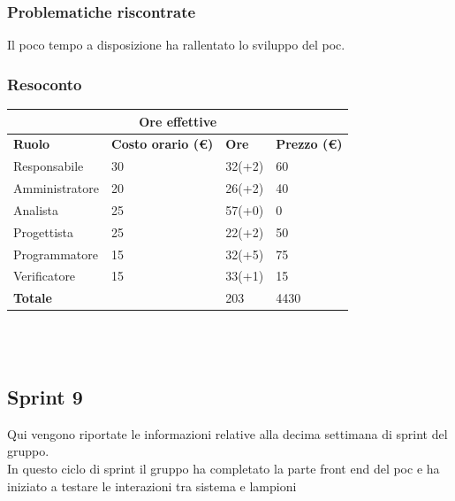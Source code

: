 \documentclass[9pt]{article}
\begin{document}
\subsubsection{Problematiche riscontrate}
Il poco tempo a disposizione ha rallentato lo sviluppo del poc.

\subsubsection{Resoconto}
\begin{center}
	\begin{tabularx}{\textwidth}{|X|X|X|X|}
		\hline
		\multicolumn{4}{|c|}{\textbf{Ore effettive}}                                      \\
		\hline
		\hline
		\textbf{Ruolo}  & \textbf{Costo orario (\euro)} & \textbf{Ore} & \textbf{Prezzo (\euro)} \\
		\hline
		Responsabile    & 30                            & 32(+2)       & 60                      \\
		\hline
		Amministratore  & 20                            & 26(+2)       & 40                      \\
		\hline
		Analista        & 25                            & 57(+0)       & 0                       \\
		\hline
		Progettista     & 25                            & 22(+2)       & 50                      \\
		\hline
		Programmatore   & 15                            & 32(+5)       & 75                      \\
		\hline
		Verificatore    & 15                            & 33(+1)       & 15                      \\
		\hline
		\hline
		\textbf{Totale} &                               & 203          & 4430                    \\
		\hline
	\end{tabularx}\\[8pt]
	\mbox{}\\
\end{center}


\subsection{Sprint 9}
Qui vengono riportate le informazioni relative alla decima settimana di sprint del gruppo. \\
In questo ciclo di sprint il gruppo ha completato la parte front end del poc e ha iniziato a testare le interazioni tra sistema e lampioni \\
\end{document}

